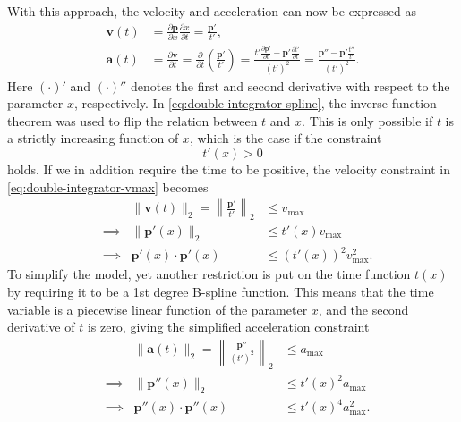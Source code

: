 With this approach, the velocity and acceleration can now be expressed as
\begin{subequations}\label{eq:double-integrator-spline}
    \begin{align}
        \mathbf{v}(t) &= \frac{\partial \mathbf{p}}{\partial x} \frac{\partial x}{\partial t} = \frac{\mathbf{p}'}{t'},
        \label{eq:double-integrator-v-spline} \\
        \mathbf{a}(t) &= \frac{\partial \mathbf{v}}{\partial t} = \frac{\partial}{\partial t} \left(\frac{\mathbf{p}'}{t'}\right) = 
        \frac{
            t'\frac{\partial \mathbf{p}'}{\partial t} - \mathbf{p}'\frac{\partial t'}{\partial t}
            }{(t')^2} = 
        \frac{\mathbf{p}'' - \mathbf{p}'\frac{t''}{t'}}{(t')^2}.
        \label{eq:double-integrator-a-spline}
    \end{align}
\end{subequations}
Here $(\cdot)'$ and $(\cdot)''$ denotes the first and second derivative with respect to the parameter $x$, respectively. In \cref{eq:double-integrator-spline}, the inverse function theorem was used to flip the relation between $t$ and $x$. This is only possible if $t$ is a strictly increasing function of $x$, which is the case if the constraint 
\begin{equation}\label{eq:constraint-t}
    t'(x) > 0
\end{equation}
holds.  
If we in addition require the time to be positive, the velocity constraint in \cref{eq:double-integrator-vmax} becomes
\begin{equation}\label{eq:double-integrator-vmax-spline}
    \begin{aligned}
        &&\|\mathbf{v}(t)\|_2 = \left\|\frac{\mathbf{p}'}{t'}\right\|_2 &\leq v_{\max} \\
        &\implies& \|\mathbf{p}'(x)\|_2 &\leq t'(x)v_{\max} \\
        &\implies& \mathbf{p}'(x)\cdot\mathbf{p}'(x) &\leq (t'(x))^2v_{\max}^2.
    \end{aligned}
\end{equation}
To simplify the model, yet another restriction is put on the time function $t(x)$ by requiring it to be a 1st degree B-spline function. This means that the time variable is a piecewise linear function of the parameter $x$, and the second derivative of $t$ is zero, giving the simplified acceleration constraint
\begin{equation}\label{eq:double-integrator-a-spline-simplified}
    \begin{aligned}
        &&\|\mathbf{a}(t)\|_2 = \left\|\frac{\mathbf{p}''}{(t')^2}\right\|_2 &\leq a_{\max} \\
        &\implies& \|\mathbf{p}''(x)\|_2 &\leq t'(x)^2a_{\max} \\
        &\implies& \mathbf{p}''(x)\cdot\mathbf{p}''(x) &\leq t'(x)^4a_{\max}^2.
    \end{aligned}
\end{equation}


